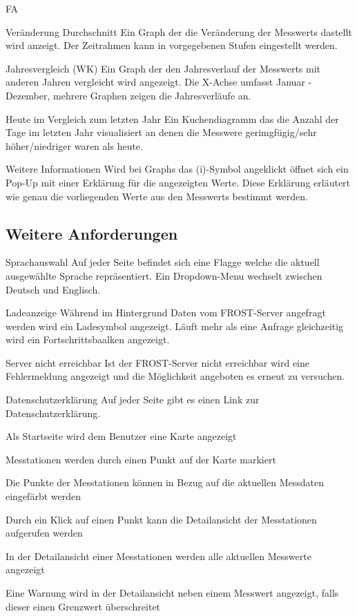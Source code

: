 \begin{Kriterien}{FA}
 \item[Veränderung Durchschnitt]
   Ein Graph der die Veränderung der \glspl{Messwert} dastellt wird anzeigt.
   Der Zeitrahmen kann in vorgegebenen Stufen eingestellt werden.

 \item[Jahresvergleich (WK)]
   Ein Graph der den Jahresverlauf der \glspl{Messwert} mit anderen Jahren vergleicht wird angezeigt.
   Die X-Achse umfasst Januar - Dezember, mehrere Graphen zeigen die Jahresverläufe an.

 \item[Heute im Vergleich zum letzten Jahr]
   Ein \gls{Kuchendiagramm} das die Anzahl der Tage im letzten Jahr visualisiert an denen die Messwere gerimgfügig/sehr höher/niedriger waren als heute.

 \item[Weitere Informationen]
   Wird bei \glspl{Graph} das (i)-Symbol angeklickt öffnet sich ein \gls{Pop-Up} mit einer Erklärung für die angezeigten Werte.
   Diese Erklärung erläutert wie genau die vorliegenden Werte aus den \glspl{Messwert} bestimmt werden.

\subsection{Weitere Anforderungen}

 \item[Sprachauswahl]
   Auf jeder Seite befindet sich eine Flagge welche die aktuell ausgewählte Sprache repräsentiert.
   Ein \gls{Dropdown-Menu} wechselt zwischen Deutsch und Englisch.

 \item[Ladeanzeige]
  Während im Hintergrund Daten vom \gls{FROST-Server} angefragt werden wird ein Ladesymbol angezeigt.
  Läuft mehr als eine Anfrage gleichzeitig wird ein Fortschrittsbaalken angezeigt.

 \item[Server nicht erreichbar]
  Ist der \gls{FROST-Server} nicht erreichbar wird eine Fehlermeldung angezeigt und die Möglichkeit angeboten es erneut zu versuchen.

 \item[Datenschutzerklärung]
  Auf jeder Seite gibt es einen Link zur Datenschutzerklärung.

    \item Als Startseite wird dem Benutzer eine Karte angezeigt
    \item Messtationen werden durch einen Punkt auf der Karte markiert
    \item Die Punkte der Messtationen können in Bezug auf die aktuellen Messdaten eingefärbt werden
    \item Durch ein Klick auf einen Punkt kann die Detailansicht der Messtationen aufgerufen werden
    \item In der Detailansicht einer Messtationen werden alle aktuellen Messwerte angezeigt
    \item Eine Warnung wird in der Detailansicht neben einem Messwert angezeigt, falls dieser einen Grenzwert überschreitet
\end{Kriterien}